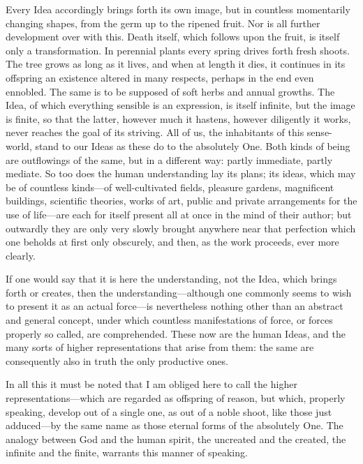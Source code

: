 \documentclass[12pt,a4paper]{article}
\begin{document}
Every Idea accordingly brings forth its own image, but in countless momentarily
changing shapes, from the germ up to the ripened fruit. Nor is all further
development over with this. Death itself, which follows upon the fruit, is itself
only a transformation. In perennial plants every spring drives forth fresh shoots.
The tree grows as long as it lives, and when at length it dies, it continues in its
offspring an existence altered in many respects, perhaps in the end even ennobled.
The same is to be supposed of soft herbs and annual growths. The Idea, of which
everything sensible is an expression, is itself infinite, but the image is finite,
so that the latter, however much it hastens, however diligently it works, never
reaches the goal of its striving. All of us, the inhabitants of this sense-world,
stand to our Ideas as these do to the absolutely One. Both kinds of being are
outflowings of the same, but in a different way: partly immediate, partly mediate.
So too does the human understanding lay its plans; its ideas, which may be of
countless kinds---of well-cultivated fields, pleasure gardens, magnificent
buildings, scientific theories, works of art, public and private arrangements for
the use of life---are each
for itself present all at once in the mind of their author; but outwardly they are
only very slowly brought anywhere near that perfection which one beholds at first
only obscurely, and then, as the work proceeds, ever more clearly.

If one would say that it is here the understanding, not the Idea, which brings
forth or creates, then the understanding---although one commonly seems to wish to
present it as an actual force---is nevertheless nothing other than an abstract and
general concept, under which countless manifestations of force, or forces properly
so called, are comprehended. These now are the human Ideas, and the many sorts of
higher representations that arise from them: the same are consequently also in
truth the only productive ones.

In all this it must be noted that I am obliged here to call the higher
representations---which are regarded as offspring of reason, but which, properly
speaking, develop out of a single one, as out of a noble shoot, like those just
adduced---by the same name as those eternal forms of the absolutely One. The analogy
between God and the human spirit, the uncreated and the created, the infinite and
the finite, warrants this manner of speaking.
\end{document}
